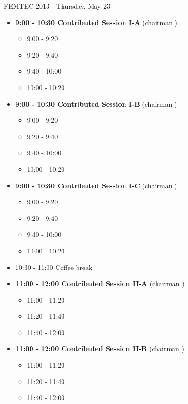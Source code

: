 \documentclass[10pt, A4]{article}
\begin{document}
\newpage
\newpage

\centerline{\huge FEMTEC 2013 - Thursday, May 23}
\vspace{4mm}

\begin{itemize}    
\item {\bf 9:00 - 10:30 Contributed Session I-A} (chairman ) 
  \begin{itemize}
    \item 9:00 - 9:20 
    \item 9:20 - 9:40 
    \item 9:40 - 10:00 
    \item 10:00 - 10:20  
  \end{itemize}
  \item {\bf 9:00 - 10:30 Contributed Session I-B} (chairman ) 
  \begin{itemize}
    \item 9:00 - 9:20 
    \item 9:20 - 9:40 
    \item 9:40 - 10:00 
    \item 10:00 - 10:20      
  \end{itemize}
    \item {\bf 9:00 - 10:30 Contributed Session I-C} (chairman ) 
  \begin{itemize}
    \item 9:00 - 9:20 
    \item 9:20 - 9:40 
    \item 9:40 - 10:00 
    \item 10:00 - 10:20      
  \end{itemize}
  \item 10:30 - 11:00 Coffee break
  \item {\bf 11:00 - 12:00 Contributed Session II-A} (chairman ) 
  \begin{itemize}
    \item 11:00 - 11:20 
    \item 11:20 - 11:40 
    \item 11:40 - 12:00 
  \end{itemize}
  \item {\bf 11:00 - 12:00 Contributed Session II-B} (chairman ) 
  \begin{itemize}
    \item 11:00 - 11:20 
    \item 11:20 - 11:40 
    \item 11:40 - 12:00  
  \end{itemize}

\end{itemize}
\end{document}
